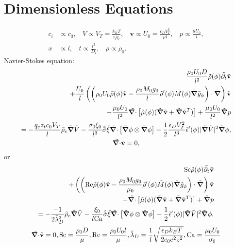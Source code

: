 \documentclass[a4paper,10pt]{article}
\renewcommand{\v}[1]{\mathbf{#1}}
\renewcommand{\v}[1]{\ensuremath{\mathbf{#1}}} %
\newcommand{\ti}[1]{\ensuremath{\tilde{#1}}} %
\newcommand{\gv}[1]{\ensuremath{\mbox{\boldmath$ #1 $}}}
\newcommand{\grad}[1]{\gv{\nabla} #1} %
\renewcommand{\div}[1]{\gv{\nabla} \cdot #1} %
\newcommand{\pdt}[1]{\partial_t #1}
\begin{document}
\section{Dimensionless Equations}
\begin{align}
c_i &\propto c_0, ~~~~ V \propto V_T = \frac{k_B T}{z_i q_e}, ~~~~\v{v} \propto U_0 = \frac{\epsilon_D V_T^2}{\mu l}, ~~~~p \propto \frac{\mu U_0}{l},\\
x &\propto l , ~~~~ t \propto \frac{l^2}{D_i}, ~~~~ \rho \propto \rho_0.
\end{align}
Navier-Stokes equation: 
\begin{gather}
\begin{split}	
\frac{\rho_0 U_0 D}{ l^2}\ti{\rho}(\phi) \ti{\pdt{}} \ti{\v{v}}\\
+ \frac{U_0}{l}\left( \left( \rho_0 
 	U_0 \ti\rho(\phi) \ti{\v{v}} - \frac{\rho_0 M_0 g_0}{l}\ti\rho'(\phi) \ti M(\phi) \ti{\grad{}} \ti g_\phi  \right) \cdot \ti{\grad{}} \right) \ti{\v{v}}\\
- \frac{\mu_0 U_0}{l^2}\ti{\div{}} \left[\ti \mu(\phi)(\ti{\grad{}} \ti{\v{v}} + \ti{\grad{}} \ti{\v{v}} ^T) \right] + \frac{\mu_0 U_0}{l^2}\ti{\grad{}} p \\
= - \frac{q_e z_t c_0 V_T}{l} \ti \rho_e \ti{\grad{}} \ti{V} - \frac{\sigma_0 \xi_0 }{l^3}\hat{\ti{\sigma}} \ti \xi\ti{\div{}} \left[ \ti{\grad{}} \phi \otimes \ti{\grad{}} \phi \right] - \frac 1 2 \frac{\epsilon_D V_T^2}{l^3} \ti \epsilon'(\phi) | \ti{\grad{}} \ti V |^2 \ti{\grad{}} \phi,
\end{split}\\
\ti{\div{}} \ti{\v{v}} = 0, 
\end{gather}
or 
\begin{gather}
\begin{split}	
\mathrm{Sc} \ti{\rho}(\phi) \ti{\pdt{}} \ti{\v{v}}\\
+ \left( \left( \mathrm{Re} \ti\rho(\phi) \ti{\v{v}} - \frac{\rho_0 M_0 g_0}{\mu_0}\ti\rho'(\phi) \ti M(\phi) \ti{\grad{}} \ti g_\phi  \right) \cdot \ti{\grad{}} \right) \ti{\v{v}}\\
- \ti{\div{}} \left[\ti \mu(\phi)(\ti{\grad{}} \ti{\v{v}} + \ti{\grad{}} \ti{\v{v}} ^T) \right] + \ti{\grad{}} p \\
= - \frac{-1}{2\tilde{\lambda}_D^2} \ti \rho_e \ti{\grad{}} \ti{V} - \frac{\xi_0 }{l \mathrm{Ca}  }\hat{\ti{\sigma}} \ti \xi\ti{\div{}} \left[ \ti{\grad{}} \phi \otimes \ti{\grad{}} \phi \right] - \frac 1 2 \ti \epsilon'(\phi) | \ti{\grad{}} \ti V |^2 \ti{\grad{}} \phi,
\end{split}\\
\ti{\div{}} \ti{\v{v}} = 0, \mathrm{Sc} = \frac{\rho_0 D}{\mu},\mathrm{Re} = \frac{\rho_0 
	U_0 l}{\mu} ,\tilde{\lambda}_D = \frac{1}{l}\sqrt{\frac{\epsilon_D k_B T}{2 c_0 e^2 z^2}}, \mathrm{Ca} = \frac{\mu_0 U_0}{\sigma_0}
\end{gather}
\end{document}
